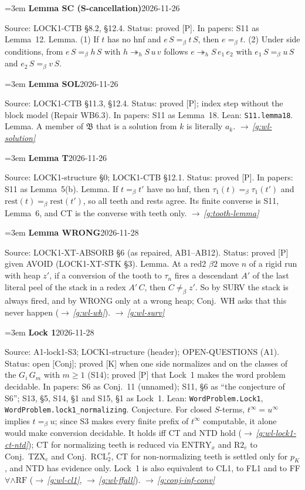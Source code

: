 \documentclass[11pt]{amsart}
\makeatletter
\newcommand{\hred}{\twoheadrightarrow_h}
\newcommand{\conv}{=_\beta}
\newcommand{\rest}{\mathrm{rest}}
\newcommand{\Bk}{\mathfrak B}
\newcounter{sense}
\newenvironment{entry}[3]{%
  \par\addvspace{\medskipamount}\noindent\phantomsection
  \def\@currentlabel{#2}\label{#1}\setcounter{sense}{0}\raggedright\emergencystretch=3em%
  \textbf{#2}\hfill{\footnotesize\textsf{#3}}\par\nopagebreak\noindent\ignorespaces}%
  {\par}
\newcommand{\src}[1]{\textsf{Source:} #1.\enskip}
\newcommand{\lean}[1]{\textsf{Lean:} #1.\enskip}
\newcommand{\status}[1]{\textsf{Status:} #1.\enskip}
\newcommand{\appears}[1]{\textsf{In papers:} #1.\enskip}
\renewcommand{\see}[1]{$\rightarrow$\,\emph{\ref{#1}}}
\makeatother
\begin{document}
\begin{entry}{g:wl-lemma-sc}{Lemma SC (S-cancellation)}{2026-11-26}
\src{LOCK1-CTB \S8.2, \S12.4}
\status{proved [P]}
\appears{S11 as Lemma~12}
Lemma. (1) If $t$ has no hnf and $e\,S\conv t\,S$, then $e\conv t$. (2) Under side conditions, from
$e\,S\conv h\,S$ with $h\hred S\,u\,v$ follows $e\hred S\,e_1\,e_2$ with $e_1\,S\conv u\,S$ and
$e_2\,S\conv v\,S$.
\end{entry}

\begin{entry}{g:wl-sol}{Lemma SOL}{2026-11-26}
\src{LOCK1-CTB \S11.3, \S12.4}
\status{proved [P]; index step without the block model (Repair WB6.3)}
\appears{S11 as Lemma~18}
\lean{\texttt{S11.lemma18}}
Lemma. A member of $\Bk$ that is a solution from $k$ is literally $a_k$. \see{g:wl-solution}
\end{entry}

\begin{entry}{g:wl-lemma-t}{Lemma T}{2026-11-26}
\src{LOCK1-structure \S0; LOCK1-CTB \S12.1}
\status{proved [P]}
\appears{S11 as Lemma~5(b)}
Lemma. If $t\conv t'$ have no hnf, then $\tau_1(t)\conv\tau_1(t')$ and $\rest(t)\conv\rest(t')$, so all
teeth and rests agree. Its finite converse is S11, Lemma~6, and CT is the converse with teeth only.
\see{g:tooth-lemma}
\end{entry}

\begin{entry}{g:wl-lemma-wrong}{Lemma WRONG}{2026-11-28}
\src{LOCK1-XT-ABSORB \S6 (as repaired, AB1--AB12)}
\status{proved [P] given AVOID (LOCK1-XT-STK \S3)}
Lemma. At a red2 $\beta2$ move $n$ of a rigid run with heap $z'$, if a conversion of the tooth to
$\tau_n$ fires a descendant $A'$ of the last literal peel of the stack in a redex $A'\,C$, then
$C\not\conv z'$. So by SURV the stack is always fired, and by WRONG only at a wrong heap; Conj.~WH asks
that this never happen (\see{g:wl-wh}). \see{g:wl-surv}
\end{entry}

\begin{entry}{g:wl-lock1}{Lock 1}{2026-11-28}
\src{A1-lock1-S3; LOCK1-structure (header); OPEN-QUESTIONS (A1)}
\status{open [Conj]; proved [K] when one side normalizes and on the classes of the $G_i\,G_m$ with
$m\ge1$ (S14); proved [P] that Lock~1 makes the word problem decidable}
\appears{S6 as Conj.~11 (unnamed); S11, \S6 as ``the conjecture of S6''; S13, \S5, S14, \S1 and S15, \S1
as Lock~1}
\lean{\texttt{WordProblem.Lock1}, \texttt{WordProblem.lock1\_normalizing}}
Conjecture. For closed $S$-terms, $t^\infty=u^\infty$ implies $t\conv u$; since S3 makes every finite
prefix of $t^\infty$ computable, it alone would make conversion decidable. It holds iff CT and NTD
hold (\see{g:wl-lock1-ct-ntd}); CT for normalizing teeth is reduced via $\mathrm{ENTRY}_x$ and $\mathrm{R2}_e$ to
Conj.~TZX$_e$ and Conj.~$\mathrm{RCL}_2^{r}$, CT for non-normalizing teeth is settled only for $p_K$, and
NTD has evidence only. Lock~1 is also equivalent to CL1, to FL1 and to FF$\forall\wedge\mathrm{RF}$ (\see{g:wl-cl1}, \see{g:wl-ffall}). \see{g:conj-inf-conv}
\end{entry}
\end{document}
